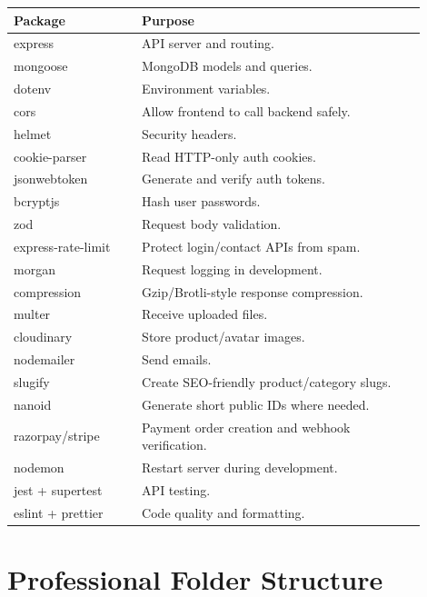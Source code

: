 \documentclass[11pt,a4paper]{article}
\begin{document}
\begin{longtable}{p{0.28\linewidth} p{0.62\linewidth}}
\toprule
\textbf{Package} & \textbf{Purpose} \\
\midrule
express & API server and routing. \\
mongoose & MongoDB models and queries. \\
dotenv & Environment variables. \\
cors & Allow frontend to call backend safely. \\
helmet & Security headers. \\
cookie-parser & Read HTTP-only auth cookies. \\
jsonwebtoken & Generate and verify auth tokens. \\
bcryptjs & Hash user passwords. \\
zod & Request body validation. \\
express-rate-limit & Protect login/contact APIs from spam. \\
morgan & Request logging in development. \\
compression & Gzip/Brotli-style response compression. \\
multer & Receive uploaded files. \\
cloudinary & Store product/avatar images. \\
nodemailer & Send emails. \\
slugify & Create SEO-friendly product/category slugs. \\
nanoid & Generate short public IDs where needed. \\
razorpay/stripe & Payment order creation and webhook verification. \\
nodemon & Restart server during development. \\
jest + supertest & API testing. \\
eslint + prettier & Code quality and formatting. \\
\bottomrule
\end{longtable}

\section{Professional Folder Structure}
\end{document}
